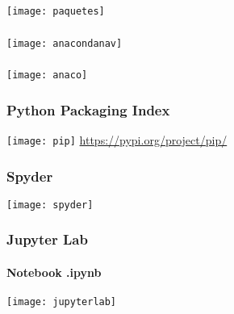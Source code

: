 \documentclass[12pt]{beamer}
\begin{document}
\begin{frame}
\frametitle{}
\centering
	\texttt{[image: paquetes]}
\end{frame}
\begin{frame}
\frametitle{}
\centering
	\texttt{[image: anacondanav]}
\end{frame}
\begin{frame}
\frametitle{}
\centering
	\texttt{[image: anaco]}
\end{frame}
\begin{frame}
 \begin{center}
    \end{center}
\end{frame}
\begin{frame}
\frametitle{Python Packaging Index}
\centering
	\texttt{[image: pip]}
\vfill
\url{https://pypi.org/project/pip/}
\end{frame}
\begin{frame}
\frametitle{Spyder}
\centering
	\texttt{[image: spyder]}
\end{frame}
\begin{frame}
\frametitle{Jupyter Lab}
\framesubtitle{Notebook .ipynb}
\centering
	\texttt{[image: jupyterlab]}
\end{frame}
\end{document}
